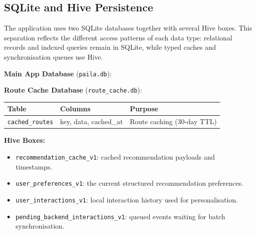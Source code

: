 \documentclass[12pt,a4paper,oneside]{report}
\begin{document}
\subsection{SQLite and Hive Persistence}

The application uses two SQLite databases together with several Hive boxes. This separation reflects the different access patterns of each data type: relational records and indexed queries remain in SQLite, while typed caches and synchronisation queues use Hive.

\textbf{Main App Database} (\texttt{paila.db}):

\begin{table}[h]
\centering
\small
{}
\end{table}

\textbf{Route Cache Database} (\texttt{route\_cache.db}):

\begin{table}[h]
\centering
\small
\begin{tabular}{lll}
\toprule
\textbf{Table} & \textbf{Columns} & \textbf{Purpose} \\
\midrule
\texttt{cached\_routes} & key, data, cached\_at & Route caching (30-day TTL) \\
\bottomrule
\end{tabular}
\end{table}

\textbf{Hive Boxes:}

\begin{itemize}
\item \texttt{recommendation\_cache\_v1}: cached recommendation payloads and timestamps.
\item \texttt{user\_preferences\_v1}: the current structured recommendation preferences.
\item \texttt{user\_interactions\_v1}: local interaction history used for personalisation.
\item \texttt{pending\_backend\_interactions\_v1}: queued events waiting for batch synchronisation.
\end{itemize}
\end{document}
